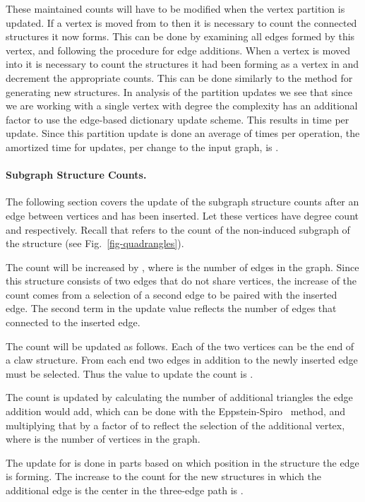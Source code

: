\documentclass[11pt]{article}
\renewcommand{\subsection}[1]{\paragraph{\textbf{#1}.}}
\begin{document}
These maintained counts will have to be modified when the vertex partition is updated. If a vertex is moved from  to  then it is necessary to count the connected structures it now forms.  This can be done by examining all edges formed by this vertex, and following the procedure for edge additions.  
When a vertex is moved into  it is necessary to count the structures it had been forming as a vertex in  and decrement the appropriate counts.  This can be done similarly to the method for generating new structures.  In analysis of the partition updates we see that since we are working with a single vertex with  degree the complexity has an additional  factor to use the edge-based dictionary update scheme. This results in  time per update.  Since this partition update is done an average of  times per operation, the amortized time for updates, per change to the input graph, is .


\subsection{Subgraph Structure Counts}



The following section covers the update of the subgraph structure counts after an edge between vertices  and  has been inserted.  Let these vertices have degree count  and  respectively. Recall that  refers to the count of the non-induced subgraph of the structure  (see Fig.~\ref{fig-quadrangles}).

The  count will be increased by , where  is the number of edges in the graph.  Since this structure consists of two edges that do not share vertices, the increase of the count comes from a selection of a second edge to be paired with the inserted edge.  The second term in the update value reflects the number of edges that connected to the inserted edge.

The  count will be updated as follows.  Each of the two vertices can be the end of a claw structure.  From each end two edges in addition to the newly inserted edge must be selected.  Thus the value to update the count is . 

The  count is updated by calculating the number of additional triangles the edge addition would add, which can be done with the 
Eppstein-Spiro~\cite{es-hgadss-09}
method, and multiplying that by a factor of  to reflect the selection of the additional vertex, where  is the number of vertices in the graph.


The update for  is done in parts based on which position in the structure the edge is forming.  The increase to the count for the new structures in which the additional edge is the center in the three-edge path is .  
\end{document}
